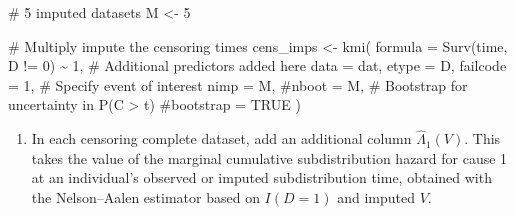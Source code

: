 \documentclass[
  12pt,
  a4paper,
]{article}
\newenvironment{Shaded}{\begin{snugshade}}{\end{snugshade}}
\newcommand{\AttributeTok}[1]{\textcolor[rgb]{0.40,0.45,0.13}{#1}}
\newcommand{\CommentTok}[1]{\textcolor[rgb]{0.37,0.37,0.37}{#1}}
\newcommand{\ControlFlowTok}[1]{\textcolor[rgb]{0.00,0.23,0.31}{\textbf{#1}}}
\newcommand{\DecValTok}[1]{\textcolor[rgb]{0.68,0.00,0.00}{#1}}
\newcommand{\FunctionTok}[1]{\textcolor[rgb]{0.28,0.35,0.67}{#1}}
\newcommand{\NormalTok}[1]{\textcolor[rgb]{0.00,0.23,0.31}{#1}}
\newcommand{\OtherTok}[1]{\textcolor[rgb]{0.00,0.23,0.31}{#1}}
\newcommand{\SpecialCharTok}[1]{\textcolor[rgb]{0.37,0.37,0.37}{#1}}
\newcommand{\StringTok}[1]{\textcolor[rgb]{0.13,0.47,0.30}{#1}}
\providecommand{\tightlist}{%
  \setlength{\itemsep}{0pt}\setlength{\parskip}{0pt}}\usepackage{longtable,booktabs,array}
\begin{document}
\begin{Shaded}
\begin{Highlighting}[]
\CommentTok{\# 5 imputed datasets}
\NormalTok{M }\OtherTok{\textless{}{-}} \DecValTok{5}

\CommentTok{\# Multiply impute the censoring times}
\NormalTok{cens\_imps }\OtherTok{\textless{}{-}} \FunctionTok{kmi}\NormalTok{(}
  \AttributeTok{formula =} \FunctionTok{Surv}\NormalTok{(time, D }\SpecialCharTok{!=} \DecValTok{0}\NormalTok{) }\SpecialCharTok{\textasciitilde{}} \DecValTok{1}\NormalTok{, }\CommentTok{\# Additional predictors added here}
  \AttributeTok{data =}\NormalTok{ dat,}
  \AttributeTok{etype =}\NormalTok{ D,}
  \AttributeTok{failcode =} \DecValTok{1}\NormalTok{, }\CommentTok{\# Specify event of interest}
  \AttributeTok{nimp =}\NormalTok{ M,}
  \CommentTok{\#nboot = M, \# Bootstrap for uncertainty in P(C \textgreater{} t)}
  \CommentTok{\#bootstrap = TRUE}
\NormalTok{)}
\end{Highlighting}
\end{Shaded}

\begin{enumerate}
\def\labelenumi{\arabic{enumi}.}
\setcounter{enumi}{2}
\tightlist
\item
  In each censoring complete dataset, add an additional column
  \(\hat{\Lambda}_1(V)\). This takes the value of the marginal
  cumulative subdistribution hazard for cause 1 at an individual's
  observed or imputed subdistribution time, obtained with the
  Nelson--Aalen estimator based on \(I(D = 1)\) and imputed \(V\).
\end{enumerate}

\begin{Shaded}
\end{Shaded}
\end{document}
